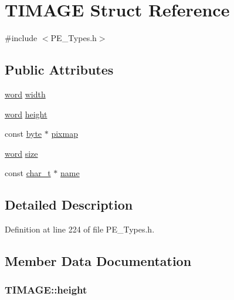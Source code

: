 \hypertarget{struct_t_i_m_a_g_e}{}\section{T\+I\+M\+A\+GE Struct Reference}
\label{struct_t_i_m_a_g_e}


{\ttfamily \#include $<$P\+E\+\_\+\+Types.\+h$>$}

\subsection*{Public Attributes}
\begin{DoxyCompactItemize}
\item 
\hyperlink{_p_e___types_8h_abad51e07ab6d26bec9f1f786c8d65bcd}{word} \hyperlink{struct_t_i_m_a_g_e_af69564519fe96b6c82d681186ad593f8}{width}
\item 
\hyperlink{_p_e___types_8h_abad51e07ab6d26bec9f1f786c8d65bcd}{word} \hyperlink{struct_t_i_m_a_g_e_a7834e8090ec3540b79a14e20b6417df0}{height}
\item 
const \hyperlink{_p_e___types_8h_a0c8186d9b9b7880309c27230bbb5e69d}{byte} $\ast$ \hyperlink{struct_t_i_m_a_g_e_a6e24a8a0c40f613d1e6a58d5420ab151}{pixmap}
\item 
\hyperlink{_p_e___types_8h_abad51e07ab6d26bec9f1f786c8d65bcd}{word} \hyperlink{struct_t_i_m_a_g_e_a0b65f7566faf0455718482a387b0e68f}{size}
\item 
const \hyperlink{_p_e___types_8h_a40bb5262bf908c328fbcfbe5d29d0201}{char\+\_\+t} $\ast$ \hyperlink{struct_t_i_m_a_g_e_a7ffc92cb3697d03d66a9bdd8cec13918}{name}
\end{DoxyCompactItemize}


\subsection{Detailed Description}


Definition at line 224 of file P\+E\+\_\+\+Types.\+h.



\subsection{Member Data Documentation}
\subsubsection[{\texorpdfstring{height}{height}}]{ T\+I\+M\+A\+G\+E\+::height}\hypertarget{struct_t_i_m_a_g_e_a7834e8090ec3540b79a14e20b6417df0}{}\label{struct_t_i_m_a_g_e_a7834e8090ec3540b79a14e20b6417df0}


